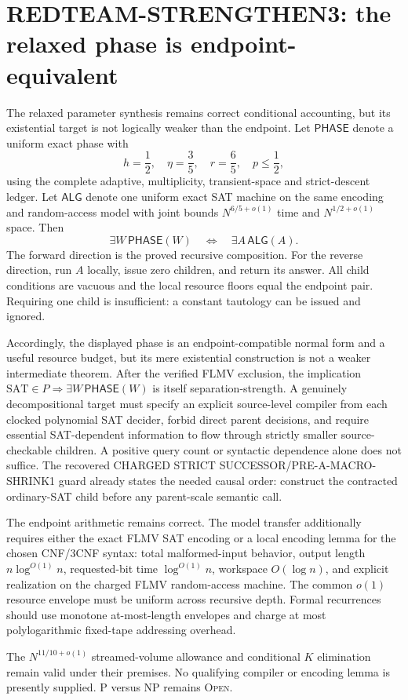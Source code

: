 \section*{REDTEAM-STRENGTHEN3: the relaxed phase is endpoint-equivalent}

The relaxed parameter synthesis remains correct conditional accounting, but
its existential target is not logically weaker than the endpoint.  Let
$\mathsf{PHASE}$ denote a uniform exact phase with
\[
 h=\frac12,\quad \eta=\frac35,\quad r=\frac65,
 \quad p\le\frac12,
\]
using the complete adaptive, multiplicity, transient-space and strict-descent
ledger.  Let $\mathsf{ALG}$ denote one uniform exact SAT machine on the same
encoding and random-access model with joint bounds
$N^{6/5+o(1)}$ time and $N^{1/2+o(1)}$ space.  Then
\[
 \boxed{\exists W\,\mathsf{PHASE}(W)
 \quad\Longleftrightarrow\quad
 \exists A\,\mathsf{ALG}(A).}
\]
The forward direction is the proved recursive composition.  For the reverse
direction, run $A$ locally, issue zero children, and return its answer.  All
child conditions are vacuous and the local resource floors equal the endpoint
pair.  Requiring one child is insufficient: a constant tautology can be
issued and ignored.

Accordingly, the displayed phase is an endpoint-compatible normal form and a
useful resource budget, but its mere existential construction is not a
weaker intermediate theorem.  After the verified FLMV exclusion, the
implication $\mathrm{SAT}\in P\Rightarrow\exists W\,\mathsf{PHASE}(W)$ is
itself separation-strength.  A genuinely decompositional target must specify
an explicit source-level compiler from each clocked polynomial SAT decider,
forbid direct parent decisions, and require essential SAT-dependent
information to flow through strictly smaller source-checkable children.  A
positive query count or syntactic dependence alone does not suffice.
The recovered CHARGED STRICT SUCCESSOR/PRE-A-MACRO-SHRINK1 guard already
states the needed causal order: construct the contracted ordinary-SAT child
before any parent-scale semantic call.

The endpoint arithmetic remains correct.  The model transfer additionally
requires either the exact FLMV SAT encoding or a local encoding lemma for the
chosen CNF/3CNF syntax: total malformed-input behavior, output length
$n\log^{O(1)}n$, requested-bit time $\log^{O(1)}n$, workspace $O(\log n)$,
and explicit realization on the charged FLMV random-access machine.  The
common $o(1)$ resource envelope must be uniform across recursive depth.
Formal recurrences should use monotone at-most-length envelopes and charge at
most polylogarithmic fixed-tape addressing overhead.

The $N^{11/10+o(1)}$ streamed-volume allowance and conditional $K$
elimination remain valid under their premises.  No qualifying compiler or
encoding lemma is presently supplied.  P versus NP remains \textsc{Open}.

